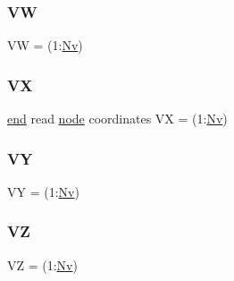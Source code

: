 \subsubsection{\texorpdfstring{VW}{VW}}
{\footnotesize\ttfamily VW = (1\+:\hyperlink{a00608_a664a2a7a8ba4f45899cfc3b5a7cbab06}{Nv})}

\mbox{\label{a00608_aa139eddff8cde21c2eaac5bb334c2ace}} 
\subsubsection{\texorpdfstring{VX}{VX}}
{\footnotesize\ttfamily \hyperlink{a00608_afb358f48b1646c750fb9da6c6585be2b}{end} read \hyperlink{a00611_adf51fe9945b6ca147057cc27ff639d0f}{node} coordinates VX = (1\+:\hyperlink{a00608_a664a2a7a8ba4f45899cfc3b5a7cbab06}{Nv})}

\mbox{\label{a00608_a2bd58f70e255b7ce76fae8d4c8359b5d}} 
\subsubsection{\texorpdfstring{VY}{VY}}
{\footnotesize\ttfamily VY = (1\+:\hyperlink{a00608_a664a2a7a8ba4f45899cfc3b5a7cbab06}{Nv})}

\mbox{\label{a00608_a862812783fd5a84e41cd43ab6ffab8dc}} 
\subsubsection{\texorpdfstring{VZ}{VZ}}
{\footnotesize\ttfamily VZ = (1\+:\hyperlink{a00608_a664a2a7a8ba4f45899cfc3b5a7cbab06}{Nv})}


